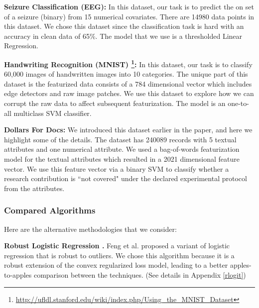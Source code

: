 \noindent\textbf{Seizure Classification (EEG): } In this dataset, our task is to predict the on set of a seizure (binary) from 15 numerical covariates. There are 14980 data points in this dataset. We chose this dataset since the classification task is hard with an accuracy in clean data of 65\%. The model that we use is a thresholded Linear Regression.

\vspace{0.25em}

\noindent\textbf{Handwriting Recognition (MNIST) \footnote{\scriptsize\url{http://ufldl.stanford.edu/wiki/index.php/Using_the_MNIST_Dataset}}: } In this dataset, our task is to classify 60,000 images of handwritten images into 10 categories. The unique part of this dataset is the featurized data consists of a 784 dimensional vector which includes edge detectors and raw image patches. We use this dataset to explore how we can corrupt the raw data to affect subsequent featurization. The model is an one-to-all multiclass SVM classifier. 

\vspace{0.25em}

\noindent\textbf{Dollars For Docs: } We introduced this dataset earlier in the paper, and here we highlight some of the details. The dataset has 240089 records with 5 textual attributes and one numerical attribute.
We used a bag-of-words featurization model for the textual attributes which resulted in a 2021 dimensional feature vector. 
We use this feature vector via a binary SVM to classify whether a research contribution is ``not covered" under the declared experimental protocol from the attributes.

\subsubsection{Compared Algorithms}
\noindent Here are the alternative methodologies that we consider:

\vspace{0.25em}

\noindent\textbf{Robust Logistic Regression \cite{feng2014robust}. } Feng et al. proposed a variant of logistic regression that is robust to outliers. We chose this algorithm because it is a robust extension of the convex regularized loss model, leading to a better apples-to-apples comparison between the techniques. (See details in Appendix \ref{rlogit})  

\vspace{0.25em}

